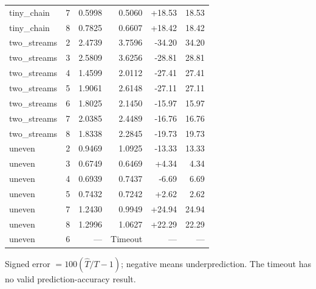 \begin{center}
\begin{longtable}{lrrrrr}
tiny\_chain & 7 & 0.5998 & 0.5060 & +18.53 & 18.53 \\
tiny\_chain & 8 & 0.7825 & 0.6607 & +18.42 & 18.42 \\
two\_streams & 2 & 2.4739 & 3.7596 & -34.20 & 34.20 \\
two\_streams & 3 & 2.5809 & 3.6256 & -28.81 & 28.81 \\
two\_streams & 4 & 1.4599 & 2.0112 & -27.41 & 27.41 \\
two\_streams & 5 & 1.9061 & 2.6148 & -27.11 & 27.11 \\
two\_streams & 6 & 1.8025 & 2.1450 & -15.97 & 15.97 \\
two\_streams & 7 & 2.0385 & 2.4489 & -16.76 & 16.76 \\
two\_streams & 8 & 1.8338 & 2.2845 & -19.73 & 19.73 \\
uneven & 2 & 0.9469 & 1.0925 & -13.33 & 13.33 \\
uneven & 3 & 0.6749 & 0.6469 & +4.34 & 4.34 \\
uneven & 4 & 0.6939 & 0.7437 & -6.69 & 6.69 \\
uneven & 5 & 0.7432 & 0.7242 & +2.62 & 2.62 \\
uneven & 7 & 1.2430 & 0.9949 & +24.94 & 24.94 \\
uneven & 8 & 1.2996 & 1.0627 & +22.29 & 22.29 \\
uneven & 6 & --- & Timeout & --- & --- \\
\bottomrule
\end{longtable}
\par\medskip\begin{minipage}{0.98\linewidth}\footnotesize Signed error $=100(\widehat T/T-1)$; negative means underprediction. The timeout has no valid prediction-accuracy result.\end{minipage}
\end{center}

